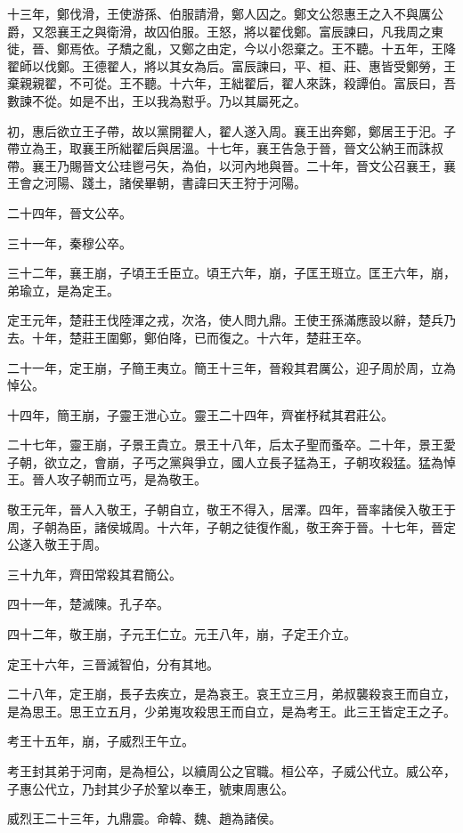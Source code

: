 十三年，鄭伐滑，王使游孫、伯服請滑，鄭人囚之。鄭文公怨惠王之入不與厲公爵，又怨襄王之與衛滑，故囚伯服。王怒，將以翟伐鄭。富辰諫曰，凡我周之東徙，晉、鄭焉依。子穨之亂，又鄭之由定，今以小怨棄之。王不聽。十五年，王降翟師以伐鄭。王德翟人，將以其女為后。富辰諫曰，平、桓、莊、惠皆受鄭勞，王棄親親翟，不可從。王不聽。十六年，王絀翟后，翟人來誅，殺譚伯。富辰曰，吾數諫不從。如是不出，王以我為懟乎。乃以其屬死之。

初，惠后欲立王子帶，故以黨開翟人，翟人遂入周。襄王出奔鄭，鄭居王于汜。子帶立為王，取襄王所絀翟后與居溫。十七年，襄王告急于晉，晉文公納王而誅叔帶。襄王乃賜晉文公珪鬯弓矢，為伯，以河內地與晉。二十年，晉文公召襄王，襄王會之河陽、踐土，諸侯畢朝，書諱曰天王狩于河陽。

二十四年，晉文公卒。

三十一年，秦穆公卒。

三十二年，襄王崩，子頃王壬臣立。頃王六年，崩，子匡王班立。匡王六年，崩，弟瑜立，是為定王。

定王元年，楚莊王伐陸渾之戎，次洛，使人問九鼎。王使王孫滿應設以辭，楚兵乃去。十年，楚莊王圍鄭，鄭伯降，已而復之。十六年，楚莊王卒。

二十一年，定王崩，子簡王夷立。簡王十三年，晉殺其君厲公，迎子周於周，立為悼公。

十四年，簡王崩，子靈王泄心立。靈王二十四年，齊崔杼弒其君莊公。

二十七年，靈王崩，子景王貴立。景王十八年，后太子聖而蚤卒。二十年，景王愛子朝，欲立之，會崩，子丐之黨與爭立，國人立長子猛為王，子朝攻殺猛。猛為悼王。晉人攻子朝而立丐，是為敬王。

敬王元年，晉人入敬王，子朝自立，敬王不得入，居澤。四年，晉率諸侯入敬王于周，子朝為臣，諸侯城周。十六年，子朝之徒復作亂，敬王奔于晉。十七年，晉定公遂入敬王于周。

三十九年，齊田常殺其君簡公。

四十一年，楚滅陳。孔子卒。

四十二年，敬王崩，子元王仁立。元王八年，崩，子定王介立。

定王十六年，三晉滅智伯，分有其地。

二十八年，定王崩，長子去疾立，是為哀王。哀王立三月，弟叔襲殺哀王而自立，是為思王。思王立五月，少弟嵬攻殺思王而自立，是為考王。此三王皆定王之子。

考王十五年，崩，子威烈王午立。

考王封其弟于河南，是為桓公，以續周公之官職。桓公卒，子威公代立。威公卒，子惠公代立，乃封其少子於鞏以奉王，號東周惠公。

威烈王二十三年，九鼎震。命韓、魏、趙為諸侯。

